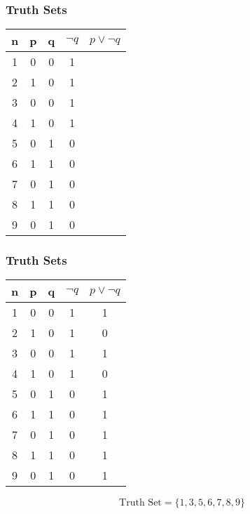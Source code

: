 \documentclass{beamer}
\begin{document}
\begin{frame}
\frametitle{Truth Sets}
\Large
\vspace{-0.5cm}
\begin{center}
\begin{tabular}{|c||c|c||c||c|}
\hline \phantom{sp} n \phantom{sp} & \phantom{sp} p \phantom{sp} & \phantom{sp}q \phantom{sp}& \phantom{s} $\neg q$ \phantom{s}& \phantom{s} $p \vee \neg q$ \phantom{s}\\  \hline
\hline 1 & 0 & 0 & 1 & \\ 
\hline 2 & 1 & 0 & 1 & \\ 
\hline 3 & 0 & 0 & 1 & \\ 
\hline 4 & 1 & 0 & 1 & \\ 
\hline 5 & 0 & 1 & 0 & \\ 
\hline 6 & 1 & 1 & 0 & \\ 
\hline 7 & 0 & 1 & 0 & \\ 
\hline 8 & 1 & 1 & 0 & \\ 
\hline 9 & 0 & 1 & 0 & \\ 
\hline 
\end{tabular}
\end{center} 
\end{frame}
\begin{frame}
\frametitle{Truth Sets}
\Large
\vspace{-0.5cm}
\begin{center}
\begin{tabular}{|c||c|c||c||c|}
\hline \phantom{sp} n \phantom{sp} & \phantom{sp} p \phantom{sp} & \phantom{sp}q \phantom{sp}& \phantom{s} $\neg q$ \phantom{s}& \phantom{s} $p \vee \neg q$ \phantom{s}\\  \hline
\hline 1 & 0 & 0 & 1 & 1\\ 
\hline 2 & 1 & 0 & 1 & 0\\ 
\hline 3 & 0 & 0 & 1 & 1\\ 
\hline 4 & 1 & 0 & 1 & 0\\ 
\hline 5 & 0 & 1 & 0 & 1\\ 
\hline 6 & 1 & 1 & 0 & 1\\ 
\hline 7 & 0 & 1 & 0 & 1\\ 
\hline 8 & 1 & 1 & 0 & 1\\ 
\hline 9 & 0 & 1 & 0 & 1\\ 
\hline 
\end{tabular}
\end{center} 
\[\mbox{Truth Set} = \{1,3,5,6,7,8,9\}\]
\end{frame}
\end{document}
